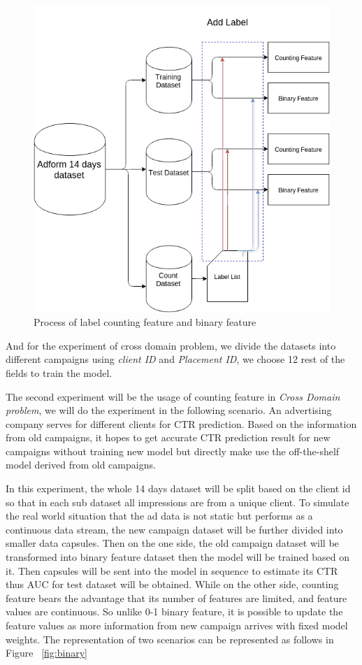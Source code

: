 \begin{figure}[h]
\centering
\includegraphics[width=\columnwidth]{datalabel.png}
\caption{Process of label counting feature and binary feature}
\label{fig:datalabel}
\end{figure}

And for the experiment of cross domain problem, we divide the datasets into different campaigns using \textit{client ID} and \textit{Placement ID}, we choose 12 rest of the fields to train the model.

The second experiment will be the usage of counting feature in \textit{Cross Domain problem}, we will do the experiment in the following scenario. An advertising company serves for different clients for CTR prediction. Based on the information from old campaigns, it hopes to get accurate CTR prediction result for new campaigns without training new model but directly make use the off-the-shelf model derived from old campaigns. 

In this experiment, the whole 14 days dataset will be split based on the client id so that in each sub dataset all impressions are from a unique client. To simulate the real world situation that the ad data is not static but performs as a continuous data stream, the new campaign dataset will be further divided into smaller data capsules. Then on the one side, the old campaign dataset will be transformed into binary feature dataset then the model will be trained based on it. Then capsules will be sent into the model in sequence to estimate its CTR thus AUC for test dataset will be obtained. 
While on the other side, counting feature bears the advantage that its number of features are limited, and feature values are continuous. So unlike 0-1 binary feature, it is possible to update the feature values as more information from new campaign arrives with fixed model weights. The representation of two scenarios can be represented as follows in Figure ~\ref{fig:binary}

